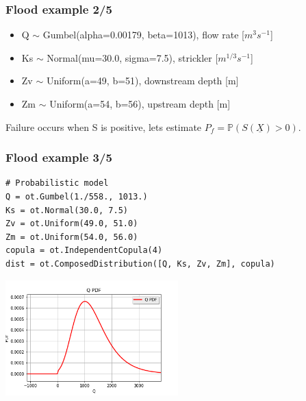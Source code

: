 \documentclass{beamer}
\begin{document}

\begin{frame}[containsverbatim]
\frametitle{Flood example 2/5}

\begin{itemize}
\item Q $\sim$ Gumbel(alpha=0.00179, beta=1013), flow rate [$m^3s^{-1}$]
\item Ks $\sim$ Normal(mu=30.0, sigma=7.5), strickler [$m^{1/3}s^{-1}$]
\item Zv $\sim$ Uniform(a=49, b=51), downstream depth [m]
\item Zm $\sim$ Uniform(a=54, b=56), upstream depth [m]
\end{itemize}

Failure occurs when S is positive, lets estimate $P_f ={\mathbb P}\left( S(\underline{X}) > 0 \right)$.

\end{frame}

\begin{frame}[containsverbatim]
\frametitle{Flood example 3/5}

\lstset{language=python}

\begin{lstlisting}
# Probabilistic model
Q = ot.Gumbel(1./558., 1013.)
Ks = ot.Normal(30.0, 7.5)
Zv = ot.Uniform(49.0, 51.0)
Zm = ot.Uniform(54.0, 56.0)
copula = ot.IndependentCopula(4)
dist = ot.ComposedDistribution([Q, Ks, Zv, Zm], copula)
\end{lstlisting}

\begin{center}
\includegraphics[width=0.5\textwidth]{figures/q_dist}
\end{center}

\end{frame}
\end{document}
